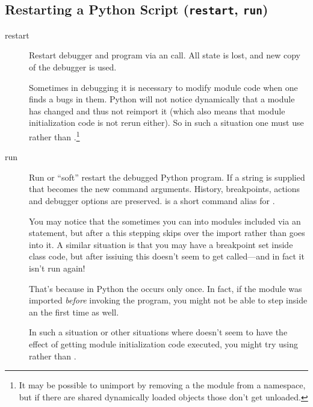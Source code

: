 \subsection{Restarting a Python Script ({\tt restart}, {\tt run})\label{subsection-restart}}

\begin{description}

\item[restart ]\label{command:restart}

Restart debugger and program via an  call. All state
is lost, and new copy of the debugger is used.

Sometimes in debugging it is necessary to modify module code when one
finds a bugs in them. Python will not notice dynamically that a module
has changed and thus not reimport it (which also means that module
initialization code is not rerun either). So in such a situation one
must use  rather than .\footnote{It may be
possible to unimport by removing a the module from a namespace, but if
there are shared dynamically loaded objects those don't get unloaded.}

\item[run ]\label{command:run}

Run or ``soft'' restart the debugged Python program. If a string is
supplied that becomes the new command arguments.  History,
breakpoints, actions and debugger options are preserved.   is
a short command alias for . 

You may notice that the sometimes you can  into modules
included via an  statement, but after a  this
stepping skips over the import rather than goes into it. A similar
situation is that you may have a breakpoint set inside class
 code, but after issiuing  this doesn't seem
to get called---and in fact it isn't run again!

That's because in Python the  occurs only once. In fact,
if the module was imported \emph{before\/} invoking the program, you
might not be able to step inside an  the first time as
well.

In such a situation or other situations where  doesn't seem
to have the effect of getting module initialization code executed,
you might try using  rather than .

\end{description}

